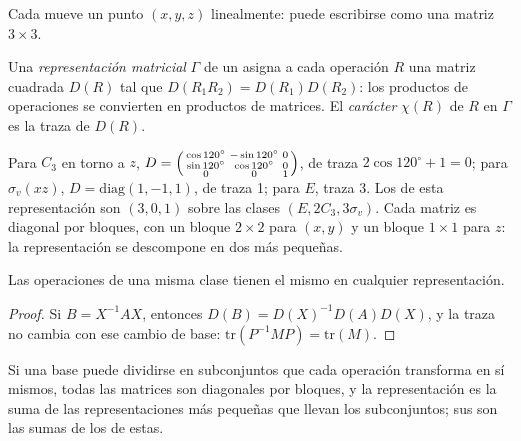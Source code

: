 Cada  mueve un punto $(x, y, z)$ linealmente: puede escribirse
como una matriz $3\times3$.

\begin{definition}\label{def:b3:point-groups:representation}
Una \emph{representación matricial} $\Gamma$ de un
 asigna a cada operación $R$ una matriz cuadrada $D(R)$ tal que
$D(R_1R_2) = D(R_1)D(R_2)$: los productos de operaciones se convierten en productos de
matrices. El \emph{carácter} $\chi(R)$ de $R$ en $\Gamma$ es
la traza de $D(R)$.
\end{definition}

\begin{example}\label{ex:b3:point-groups:xyz}
Para $C_3$ en torno a $z$, $D = \begin{psmallmatrix}\cos120^\circ & -\sin120^\circ &
0\\ \sin120^\circ & \cos120^\circ & 0\\ 0 & 0 & 1\end{psmallmatrix}$, de traza
$2\cos120^\circ + 1 = 0$; para $\sigma_v(xz)$, $D = \mathrm{diag}(1, -1, 1)$, de traza
1; para $E$, traza 3. Los  de esta representación son $(3, 0, 1)$ sobre
las clases $(E, 2C_3, 3\sigma_v)$. Cada matriz es diagonal por bloques, con un
bloque $2\times2$ para $(x, y)$ y un bloque $1\times1$ para $z$: la
representación se descompone en dos más pequeñas.
\end{example}

\begin{proposition}\label{prop:b3:point-groups:class-characters}
Las operaciones de una misma clase tienen el mismo  en cualquier representación.
\end{proposition}

\begin{proof}
Si $B = X^{-1}AX$, entonces $D(B) = D(X)^{-1}D(A)D(X)$, y la traza no cambia con
ese cambio de base: $\mathrm{tr}(P^{-1}MP) = \mathrm{tr}(M)$.
\end{proof}

\begin{proposition}\label{prop:b3:point-groups:direct-sum}
Si una base puede dividirse en subconjuntos que cada operación transforma en
sí mismos, todas las matrices son diagonales por bloques, y la representación es la
suma de las representaciones más pequeñas que llevan los subconjuntos; sus 
son las sumas de los de estas.
\end{proposition}


